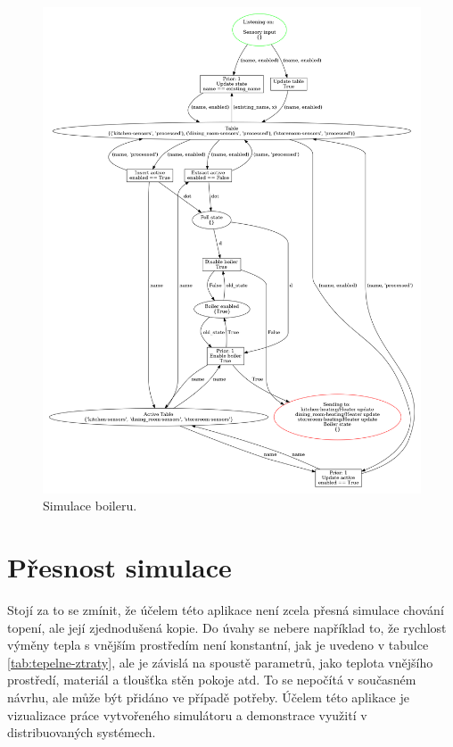 \begin{figure}[httb]
 \centering
 \includegraphics[width=\textwidth]{obrazky-figures/boiler-logic.png}
 \caption{Simulace boileru.}
 \label{boiler-logic-viz}
\end{figure}

\section{Přesnost simulace}

Stojí za to se zmínit, že účelem této aplikace není zcela přesná simulace chování topení, ale její zjednodušená kopie. Do úvahy se nebere například to, že rychlost výměny tepla s vnějším prostředím není konstantní, jak je uvedeno v tabulce \ref{tab:tepelne-ztraty}, ale je závislá na spoustě parametrů, jako teplota vnějšího prostředí, materiál a tloušťka stěn pokoje atd. To se nepočítá v současném návrhu, ale může být přidáno ve případě potřeby. Účelem této aplikace je vizualizace práce vytvořeného simulátoru a demonstrace využití v distribuovaných systémech.

